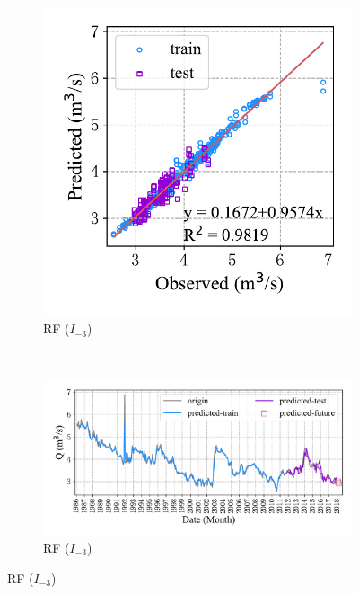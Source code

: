 \begin{figure}[!htbp]
\begin{subfigure}[b]{0.615\textwidth}
  \end{subfigure}
  \\
  \centering
  \begin{subfigure}[b]{0.305\textwidth}
    \includegraphics[width=\textwidth]{Img/chap4_spr/spr_scatter_in_3_out_2_rf.pdf}
    \vspace{-1.2cm}
    \caption{RF ($I_{-3}$)}
    \label{fig:spr_scatter_in_3_out_2_rf}
  \end{subfigure}
  ~
  \begin{subfigure}[b]{0.615\textwidth}
    \includegraphics[width=\textwidth]{Img/chap4_spr/spr_series_in_3_out_2_rf.pdf}
    \vspace{-1.2cm}
    \caption{RF ($I_{-3}$)}
    \label{fig:spr_series_in_3_out_2_rf}

\end{subfigure}
\end{figure}

